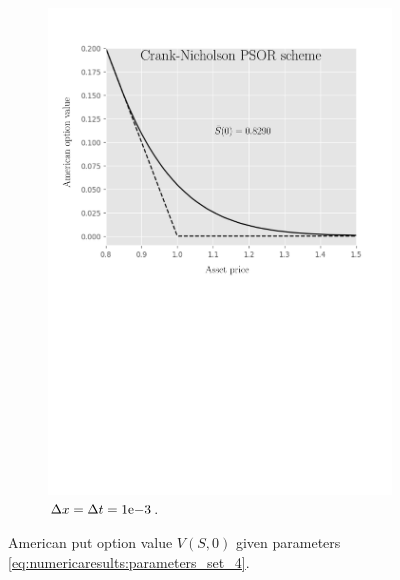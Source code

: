 \begin{figure}[H]
\begin{subfigure}{0.4\textwidth}
    \includegraphics[width=\textwidth]{chapters/chapter5/TestCase4CrankNicholsonLCP.pdf}
    \caption{$\Delta{x}=\Delta{t}={1}\mathrm{e}{-3}$.}
  \end{subfigure}
  \caption{American put option value $V(S, 0)$ given parameters \eqref{eq:numericaresults:parameters_set_4}.}
  \label{fig:lcp:numericaresults:test_case_4}
\end{figure}

